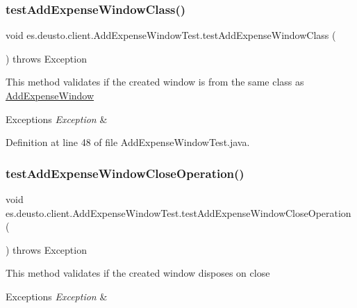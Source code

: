 \subsubsection{\texorpdfstring{test\+Add\+Expense\+Window\+Class()}{testAddExpenseWindowClass()}}
{\footnotesize\ttfamily void es.\+deusto.\+client.\+Add\+Expense\+Window\+Test.\+test\+Add\+Expense\+Window\+Class (\begin{DoxyParamCaption}{ }\end{DoxyParamCaption}) throws Exception}

This method validates if the created window is from the same class as \hyperlink{classes_1_1deusto_1_1client_1_1_add_expense_window}{Add\+Expense\+Window} 
\begin{DoxyExceptions}{Exceptions}
{\em Exception} & \\
\hline
\end{DoxyExceptions}


Definition at line 48 of file Add\+Expense\+Window\+Test.\+java.

\mbox{\label{classes_1_1deusto_1_1client_1_1_add_expense_window_test_abf270b5711e0c1fd74e7818e96487c46}} 
\subsubsection{\texorpdfstring{test\+Add\+Expense\+Window\+Close\+Operation()}{testAddExpenseWindowCloseOperation()}}
{\footnotesize\ttfamily void es.\+deusto.\+client.\+Add\+Expense\+Window\+Test.\+test\+Add\+Expense\+Window\+Close\+Operation (\begin{DoxyParamCaption}{ }\end{DoxyParamCaption}) throws Exception}

This method validates if the created window disposes on close 
\begin{DoxyExceptions}{Exceptions}
{\em Exception} & \\
\hline
\end{DoxyExceptions}


